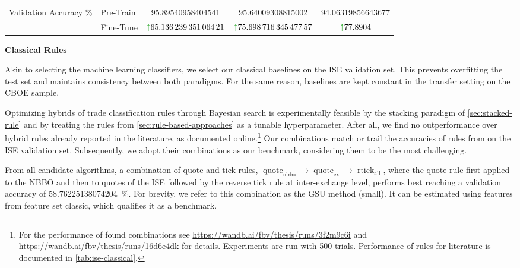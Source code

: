 \begin{table}[!h]
\begin{tabular}{@{}llSSS@{}}
        Validation Accuracy \%               & Pre-Train                                           & {\num{95.89540958404541}}                                  & {\num{95.64009308815002}}                                   & {\num{94.06319856643677}}                         \\
                                             & Fine-Tune                                           & {$\textcolor{viz-green}{\uparrow}\num{65.13623935106421}$} & {$\textcolor{viz-green}{\uparrow} \num{75.69871634547757}$} & {$\textcolor{viz-green}{\uparrow} \num{77.8904}$} \\ \bottomrule
    \end{tabular}
\end{table}

\textbf{Classical Rules}

Akin to selecting the machine learning classifiers, we select our classical baselines on the \gls{ISE} validation set. This prevents \gls{overfitting} the test set and maintains consistency between both paradigms. For the same reason, baselines are kept constant in the transfer setting on the \gls{CBOE} sample.

Optimizing hybrids of trade classification rules through Bayesian search is experimentally feasible by the stacking paradigm of \cref{sec:stacked-rule} and by treating the rules from \cref{sec:rule-based-approaches} as a tunable hyperparameter. After all, we find no outperformance over hybrid rules already reported in the literature, as documented online.\footnote{For the performance of found combinations see \url{https://wandb.ai/fbv/thesis/runs/3f2m9c6i} and \url{https://wandb.ai/fbv/thesis/runs/16d6e4dk} for details. Experiments are run with \num{500} trials. Performance of rules for literature is documented in \cref{tab:ise-classical}.} Our combinations match or trail the accuracies of rules from \textcite[\checkmark][13--15]{grauerOptionTradeClassification2022} on the \gls{ISE} validation set. Subsequently, we adopt their combinations as our benchmark, considering them to be the most challenging.

From all candidate algorithms, a combination of quote and tick rules, $\operatorname{quote}_{\mathrm{nbbo}} \to \operatorname{quote}_{\mathrm{ex}} \to \operatorname{rtick}_{\mathrm{all}}$, where the quote rule first applied to the \gls{NBBO} and then to quotes of the \gls{ISE} followed by the reverse tick rule at inter-exchange level, performs best reaching a validation accuracy of \SI{58.76225138074204}{\percent}. For brevity, we refer to this combination as the \gls{GSU} method (small). It can be estimated using features from feature set classic, which qualifies it as a benchmark.

